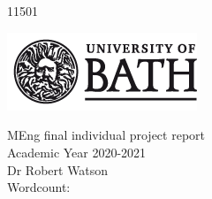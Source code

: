 \begin{titlepage}
	\begin{center}
	\vspace*{2cm}
	\Huge
	\textbf{\thetitle}\\
	\vspace{2cm}
	\LARGE
	\textbf{\theauthor}\\
	11501
	
	\vspace{2cm}
	
	\includegraphics{../figures/uob-logo-black-transparent}
	
	\vspace{3cm}
	
	MEng final individual project report\\
	\vfill
	Academic Year 2020-2021\\
	Dr Robert Watson\\
	
	Wordcount: 
	\end{center}
	
\end{titlepage}
